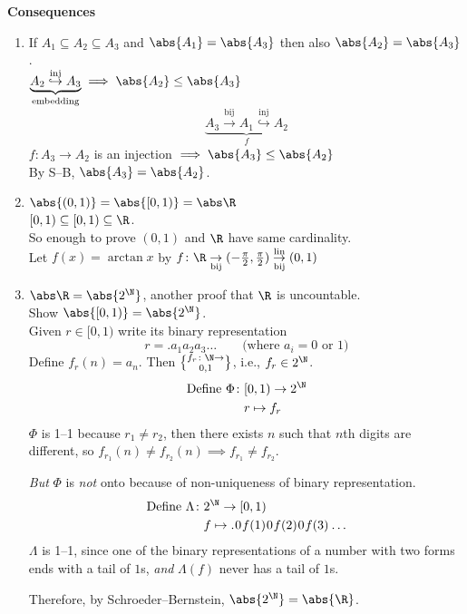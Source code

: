 \textbf{Consequences}
\begin{enumerate}
\item If $A_1\subseteq A_2\subseteq A_3$ and $\abs{A_1}=\abs{A_3}$ then also $\abs{A_2}=\abs{A_3}$. \\
\pf $\underbrace{A_2 \overset{\text{inj}}{\hookrightarrow} A_3}_{\text{embedding}}\implies\abs{A_2}\leq\abs{A_3}$
\[ \underbrace{A_3 \overset{\text{bij}}{\to} A_1 \overset{\text{inj}}{\hookrightarrow} A_2}_f \]
$f\colon A_3\to A_2$ is an injection $\implies\abs{A_3}\leq\abs{A_2}$ \\
By S--B, $\abs{A_3}=\abs{A_2}$.
\item $\abs{(0,1)}=\abs{[0,1)}=\abs\R$ %
\\$[0,1)\subseteq[0,1)\subseteq\R$. \\
So enough to prove $(0,1)$ and $\R$ have same cardinality. \\
Let $f(x)=\arctan x$ by $f\colon\R\underset{\text{bij}}{\to}(-\frac{\pi}{2},\frac{\pi}{2})\overset{\text{lin}}{\underset{\text{bij}}{\to}}(0,1)$
%
\item $\abs\R=\abs{2^\N}$, another proof that $\R$ is uncountable. \\
Show $\abs{[0,1)}=\abs{2^\N}$. \\
Given $r\in[0,1)$ write its binary representation
\[ r = .a_1a_2a_3\ldots \qquad\text{(where $a_i=0$ or $1$)} \]
Define $f_r(n)=a_n$.  Then $f_r\colon\N\to\brace{0,1}$, i.e., $f_r\in2^\N$.%
\begin{align*}
\text{Define } \Phi\colon & [0,1) \to 2^\N \\
& r \mapsto f_r
\end{align*}
$\Phi$ is 1--1 because $r_1\neq r_2$, then there exists $n$ such that $n$th digits are different, so $f_{r_1}(n)\neq f_{r_2}(n)\implies f_{r_1}\neq f_{r_2}$.

\emph{But} $\Phi$ is \emph{not} onto because of non-uniqueness of binary representation.
%
\begin{align*}
\text{Define } \Lambda\colon & 2^\N \to [0,1) \\
& f \mapsto .\mspace{1mu}0\mspace{1mu}f(1)\mspace{1mu}0\mspace{1mu}f(2)\mspace{1mu}0\mspace{1mu}f(3)\mspace{1mu}\ldots
\end{align*}
$\Lambda$ is 1--1, since one of the binary representations of a number with two forms ends with a tail of $1$s, \emph{and} $\Lambda(f)$ never has a tail of $1$s.

Therefore, by Schroeder--Bernstein, $\abs{2^\N}=\abs{\R}$.
\end{enumerate}
